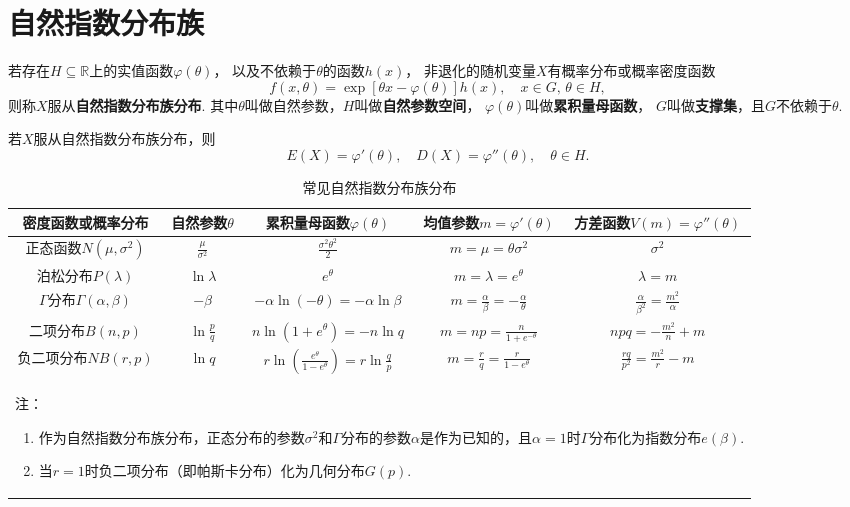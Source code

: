 \section{自然指数分布族}
\begin{definition}
若存在\(H \subseteq \mathbb{R}\)上的实值函数\(\varphi(\theta)\)，%
以及不依赖于\(\theta\)的函数\(h(x)\)，%
非退化的随机变量\(X\)有概率分布或概率密度函数\[
f(x,\theta) = \exp[\theta x - \varphi(\theta)] h(x),
\quad x \in G,\,\theta \in H,
\]则称\(X\)服从\textbf{自然指数分布族分布}.
其中\(\theta\)叫做自然参数，\(H\)叫做\textbf{自然参数空间}，%
\(\varphi(\theta)\)叫做\textbf{累积量母函数}，%
\(G\)叫做\textbf{支撑集}，且\(G\)不依赖于\(\theta\).
\end{definition}

\begin{theorem}
若\(X\)服从自然指数分布族分布，则\[
E(X) = \varphi'(\theta),
\quad
D(X) = \varphi''(\theta),
\quad
\theta \in H.
\]
\end{theorem}

\begin{landscape}
\begin{table}
\def\arraystretch{2.1}
\centering
\caption{常见自然指数分布族分布}
\begin{tabular}{|*{5}{c|}}
\hline
密度函数或概率分布 & 自然参数\(\theta\) & 累积量母函数\(\varphi(\theta)\) & 均值参数\(m=\varphi'(\theta)\) & 方差函数\(V(m) = \varphi''(\theta)\) \\ \hline
正态函数\(N(\mu,\sigma^2)\) & \(\frac{\mu}{\sigma^2}\) & \(\frac{\sigma^2 \theta^2}{2}\) & \(m=\mu=\theta\sigma^2\) & \(\sigma^2\) \\ \hline
泊松分布\(P(\lambda)\) & \(\ln\lambda\) & \(e^{\theta}\) & \(m=\lambda=e^{\theta}\) & \(\lambda=m\) \\ \hline
\(\Gamma\)分布\(\Gamma(\alpha,\beta)\) & \(-\beta\) & \(-\alpha\ln(-\theta)=-\alpha\ln\beta\) & \(m=\frac{\alpha}{\beta}=-\frac{\alpha}{\theta}\) & \(\frac{\alpha}{\beta^2}=\frac{m^2}{\alpha}\) \\ \hline
二项分布\(B(n,p)\) & \(\ln\frac{p}{q}\) & \(n\ln(1+e^{\theta})=-n\ln{q}\) & \(m=np=\frac{n}{1+e^{-\theta}}\) & \(npq=-\frac{m^2}{n}+m\) \\ \hline
负二项分布\(NB(r,p)\) & \(\ln{q}\) & \(r\ln(\frac{e^{\theta}}{1-e^{\theta}})=r\ln\frac{q}{p}\) & \(m=\frac{r}{q}=\frac{r}{1-e^{\theta}}\) & \(\frac{rq}{p^2}=\frac{m^2}{r}-m\) \\ \hline
\multicolumn{5}{l}{%
\begin{minipage}{.7\paperwidth}
\vspace{1em}
注：\begin{enumerate}
\item 作为自然指数分布族分布，正态分布的参数\(\sigma^2\)和\(\Gamma\)分布的参数\(\alpha\)是作为已知的，且\(\alpha=1\)时\(\Gamma\)分布化为指数分布\(e(\beta)\).
\item 当\(r=1\)时负二项分布（即帕斯卡分布）化为几何分布\(G(p)\).
\end{enumerate}
\end{minipage}
} \\
\end{tabular}
\end{table}
\end{landscape}

